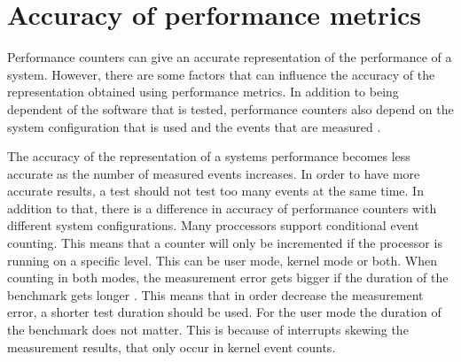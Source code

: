 \section{Accuracy of performance metrics}
Performance counters can give an accurate representation of the performance of a system. However, there are some factors that can influence the accuracy of the representation obtained using performance metrics. In addition to being dependent of the software that is tested, performance counters also depend on the system configuration that is used and the events that are measured \cite{korn2001just}.

The accuracy of the representation of a systems performance becomes less accurate as the number of measured events increases. In order to have more accurate results, a test should not test too many events at the same time.
In addition to that, there is a difference in accuracy of performance counters with different system configurations. Many proccessors support conditional event counting. This means that a counter will only be incremented if the processor is running on a specific level. This can be user mode, kernel mode or both. When counting in both modes, the measurement error gets bigger if the duration of the benchmark gets longer \cite{AccuracyPerformanceCounter}. This means that in order decrease the measurement error, a shorter test duration should be used. For the user mode the duration of the benchmark does not matter. This is because of interrupts skewing the measurement results, that only occur in kernel event counts.



